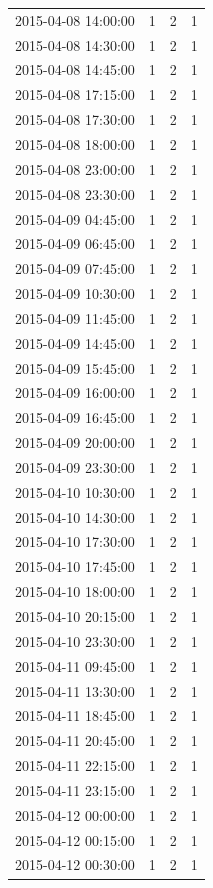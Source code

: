 \begin{tabular}{lrrr}
2015-04-08 14:00:00 & 1 & 2 & 1 \\
2015-04-08 14:30:00 & 1 & 2 & 1 \\
2015-04-08 14:45:00 & 1 & 2 & 1 \\
2015-04-08 17:15:00 & 1 & 2 & 1 \\
2015-04-08 17:30:00 & 1 & 2 & 1 \\
2015-04-08 18:00:00 & 1 & 2 & 1 \\
2015-04-08 23:00:00 & 1 & 2 & 1 \\
2015-04-08 23:30:00 & 1 & 2 & 1 \\
2015-04-09 04:45:00 & 1 & 2 & 1 \\
2015-04-09 06:45:00 & 1 & 2 & 1 \\
2015-04-09 07:45:00 & 1 & 2 & 1 \\
2015-04-09 10:30:00 & 1 & 2 & 1 \\
2015-04-09 11:45:00 & 1 & 2 & 1 \\
2015-04-09 14:45:00 & 1 & 2 & 1 \\
2015-04-09 15:45:00 & 1 & 2 & 1 \\
2015-04-09 16:00:00 & 1 & 2 & 1 \\
2015-04-09 16:45:00 & 1 & 2 & 1 \\
2015-04-09 20:00:00 & 1 & 2 & 1 \\
2015-04-09 23:30:00 & 1 & 2 & 1 \\
2015-04-10 10:30:00 & 1 & 2 & 1 \\
2015-04-10 14:30:00 & 1 & 2 & 1 \\
2015-04-10 17:30:00 & 1 & 2 & 1 \\
2015-04-10 17:45:00 & 1 & 2 & 1 \\
2015-04-10 18:00:00 & 1 & 2 & 1 \\
2015-04-10 20:15:00 & 1 & 2 & 1 \\
2015-04-10 23:30:00 & 1 & 2 & 1 \\
2015-04-11 09:45:00 & 1 & 2 & 1 \\
2015-04-11 13:30:00 & 1 & 2 & 1 \\
2015-04-11 18:45:00 & 1 & 2 & 1 \\
2015-04-11 20:45:00 & 1 & 2 & 1 \\
2015-04-11 22:15:00 & 1 & 2 & 1 \\
2015-04-11 23:15:00 & 1 & 2 & 1 \\
2015-04-12 00:00:00 & 1 & 2 & 1 \\
2015-04-12 00:15:00 & 1 & 2 & 1 \\
2015-04-12 00:30:00 & 1 & 2 & 1 \\

\end{tabular}
